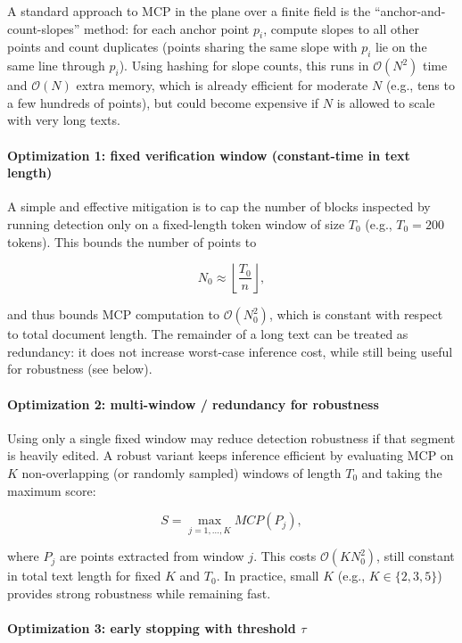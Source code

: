 \documentclass[a4paper,11pt]{llncs}
\begin{document}
A standard approach to MCP in the plane over a finite field is the
``anchor-and-count-slopes'' method: for each anchor point $p_i$, compute slopes
to all other points and count duplicates (points sharing the same slope with
$p_i$ lie on the same line through $p_i$). Using hashing for slope counts, this
runs in $\mathcal{O}(N^2)$ time and $\mathcal{O}(N)$ extra memory, which is already efficient for moderate $N$ (e.g., tens to a few hundreds of
points), but could become expensive if $N$ is allowed to scale with very long
texts.

\paragraph{Optimization 1: fixed verification window (constant-time in text length)}

A simple and effective mitigation is to cap the number of blocks inspected by
running detection only on a fixed-length token window of size $T_0$
(e.g., $T_0=200$ tokens). This bounds the number of points to

\[
    N_0 \approx \left\lfloor \frac{T_0}{n}\right\rfloor ,
\]

and thus bounds MCP computation to $\mathcal{O}(N_0^2)$, which is constant with
respect to total document length. The remainder of a long text can be treated as
redundancy: it does not increase worst-case inference cost, while still being
useful for robustness (see below).

\paragraph{Optimization 2: multi-window / redundancy for robustness}

Using only a single fixed window may reduce detection robustness if that segment
is heavily edited. A robust variant keeps inference efficient by evaluating MCP
on $K$ non-overlapping (or randomly sampled) windows of length $T_0$ and taking
the maximum score:

\[
    S = \max_{j=1,\dots,K} MCP(P_j),
\]

where $P_j$ are points extracted from window $j$. This costs
$\mathcal{O}(K N_0^2)$, still constant in total text length for fixed $K$ and
$T_0$. In practice, small $K$ (e.g., $K\in\{2,3,5\}$) provides strong robustness
while remaining fast.

\paragraph{Optimization 3: early stopping with threshold $\tau$}
\end{document}
